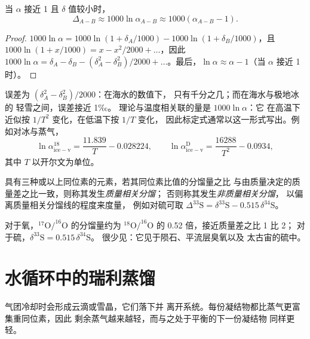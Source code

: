 \begin{proposition}[同位素差值与分馏系数]
\label{prop:b3:stable-isotopes:big-delta}
当 $\alpha$ 接近 1 且 $\delta$ 值较小时，
\[
\Delta_{A-B} \approx 1000\ln\alpha_{A-B} \approx 1000(\alpha_{A-B} - 1).
\]
\end{proposition}

\begin{proof}
$1000\ln\alpha = 1000\ln(1 + \delta_A/1000) - 1000\ln(1 + \delta_B/1000)$，且
$1000\ln(1 + x/1000) = x - x^2/2000 + \dots$，因此 $1000\ln\alpha = \delta_A -
\delta_B - (\delta_A^2 - \delta_B^2)/2000 + \dots$。最后，$\ln\alpha \approx
\alpha - 1$（当 $\alpha$ 接近 1 时）。
\end{proof}

误差为 $(\delta_A^2 - \delta_B^2)/2000$：在海水的数值下，
只有千分之几；而在海水与极地冰的
轻雪之间，误差接近 1‰。
理论与温度相关联的量是 $1000\ln\alpha$：它
在高温下近似按 $1/T^2$ 变化，在低温下按 $1/T$ 变化，
因此标定式通常以这一形式写出。例如对冰与蒸气，
\[
\ln\alpha^{18}_{\mathrm{ice-v}} = \frac{11.839}{T} - 0.028224, \qquad
\ln\alpha^{\mathrm D}_{\mathrm{ice-v}} = \frac{16288}{T^2} - 0.0934,
\]
其中 $T$ 以开尔文为单位。

\begin{definition}[质量相关分馏与非质量相关分馏]\label{def:b3:stable-isotopes:mif}
具有三种或以上同位素的元素，若其同位素比值的分馏量之比
与由质量决定的质量差之比一致，则称其发生\emph{质量相关分馏}；
否则称其发生\emph{非质量相关分馏}，
以偏离质量相关分馏线的程度来度量，
例如对硫可取
$\Delta^{33}\mathrm S = \delta^{33}\mathrm S
- 0.515\,\delta^{34}\mathrm S$。
\end{definition}

对于氧，$^{17}\mathrm O/^{16}\mathrm O$ 的分馏量约为
$^{18}\mathrm O/^{16}\mathrm O$ 的 0.52 倍，接近质量差之比 1 比 2；
对于硫，$\delta^{33}\mathrm S = 0.515\,\delta^{34}\mathrm S$。
很少见：它见于陨石、平流层臭氧以及
太古宙的硫中。

\section{水循环中的瑞利蒸馏}\label{sec:b3:stable-isotopes:rayleigh}

气团冷却时会形成云滴或雪晶，它们落下并
离开系统。每份凝结物都比蒸气更富集重同位素，因此
剩余蒸气越来越轻，而与之处于平衡的下一份凝结物
同样更轻。

